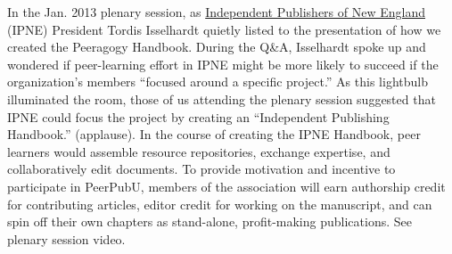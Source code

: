 In the Jan. 2013 plenary session, as \href{http://IPNE.org}{Independent
Publishers of New England} (IPNE) President Tordis Isselhardt quietly
listed to the presentation of how we created the Peeragogy Handbook.
During the Q\&A, Isselhardt spoke up and wondered if peer-learning
effort in IPNE might be more likely to succeed if the organization's
members ``focused around a specific project.'' As this lightbulb
illuminated the room, those of us attending the plenary session
suggested that IPNE could focus the project by creating an ``Independent
Publishing Handbook.'' (applause). In the course of creating the IPNE
Handbook, peer learners would assemble resource repositories, exchange
expertise, and collaboratively edit documents. To provide motivation and
incentive to participate in PeerPubU, members of the association will
earn authorship credit for contributing articles, editor credit for
working on the manuscript, and can spin off their own chapters as
stand-alone, profit-making publications. See plenary session video.
